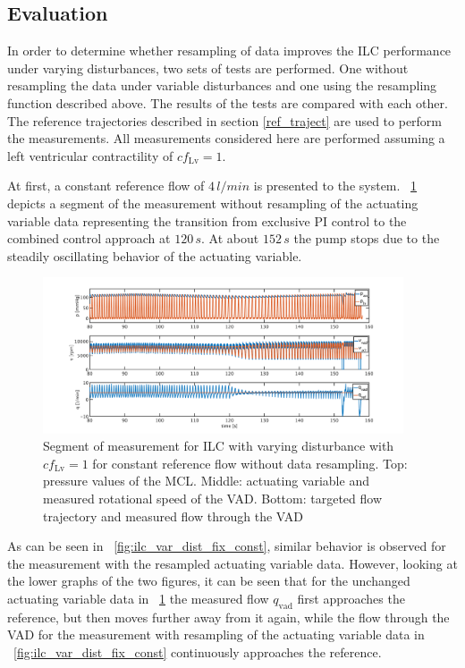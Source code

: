 \subsection{Evaluation}
In order to determine whether resampling of data improves the ILC performance under varying disturbances, two sets of tests are performed. One without resampling the data under variable disturbances and one using the resampling function described above. The results of the tests are compared with each other.
The reference trajectories described in section \ref{ref_traject} are used to perform the measurements. All measurements considered here are performed assuming a left ventricular contractility of $cf_{\mathrm{Lv}}=1$.


At first, a constant reference flow of $4\,l/min$ is presented to the system. \figurename~\ref{fig:ilc_var_dist_unfix_const} depicts a segment of the measurement without resampling of the actuating variable data representing the transition from exclusive PI control to the combined control approach at $120\,s$. At about $152\,s$ the pump stops due to the steadily oscillating behavior of the actuating variable.
\begin{figure}[ht!]
  \centering
  \includegraphics[width=0.95\textwidth]{images/chapt_5/ILC/ilc_var_dist_unfix_const.pdf}
  \caption[Segment of measurement for ILC with varying disturbance with $cf_{\mathrm{Lv}}=1$ for constant reference flow without data resampling]{Segment of measurement for ILC with varying disturbance with $cf_{\mathrm{Lv}}=1$ for constant reference flow without data resampling. Top:  pressure values of the MCL. Middle: actuating variable and measured rotational speed of the VAD. Bottom: targeted flow trajectory and measured flow through the VAD}
  \label{fig:ilc_var_dist_unfix_const}
\end{figure}
As can be seen in \figurename~\ref{fig:ilc_var_dist_fix_const}, similar behavior is observed for the measurement with the resampled actuating variable data.
However, looking at the lower graphs of the two figures, it can be seen that for the unchanged actuating variable data in \figurename~\ref{fig:ilc_var_dist_unfix_const} the measured flow $q_{\mathrm{vad}}$ first approaches the reference, but then moves further away from it again, while the flow through the VAD for the measurement with resampling of the actuating variable data in \figurename~\ref{fig:ilc_var_dist_fix_const} continuously approaches the reference.
